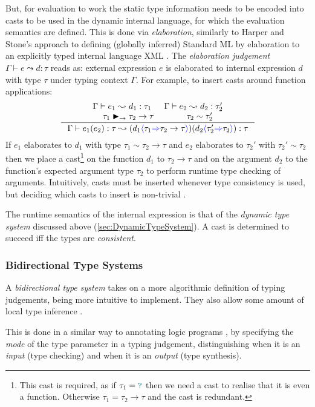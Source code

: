 But, for evaluation to work the static type information needs to be encoded into casts to be used in the dynamic internal language, for which the evaluation semantics are defined. This is done via \textit{elaboration}, similarly to Harper and Stone's approach to defining (globally inferred) Standard ML \cite{StandardMLTypeTheory} by elaboration to an explicitly typed internal language XML \cite{CoreXML}. The \textit{elaboration judgement} $\Gamma \vdash e \leadsto d : \tau$ reads as: external expression $e$ is elaborated to internal expression $d$ with type $\tau$ under typing context $\Gamma$. For example, to insert casts around function applications:
\[\inference{\Gamma \vdash e_1 \leadsto d_1 : \tau_1 & \Gamma \vdash e_2 \leadsto d_2 : \tau_2' \\ \tau_1 \funmatch \tau_2 \to \tau  & \tau_2 \sim \tau_2'}{\Gamma \vdash e_1(e_2) : \tau \leadsto (d_1\scast{\tau_1}{\tau_2 \to \tau})(d_2\scast{\tau_2'}{\tau_2}) : \tau}\]
If $e_1$ elaborates to $d_1$ with type $\tau_1 \sim \tau_2 \to \tau$ and $e_2$ elaborates to $\tau_2'$ with $\tau_2' \sim \tau_2$ then we place a cast\footnote{This cast is required, as if $\tau_1 = {\color{teal}\texttt{?}}$ then we need a cast to realise that it is even a function. Otherwise $\tau_1 = \tau_2 \to \tau$ and the cast is redundant.} on the function $d_1$ to $\tau_2 \to \tau$ and on the argument $d_2$ to the function's expected argument type $\tau_2$ to perform runtime type checking of arguments.
Intuitively, casts must be inserted whenever type consistency is used, but deciding which casts to insert is non-trivial \cite{Gradualizer}.

The runtime semantics of the internal expression is that of the \textit{dynamic type system} discussed above (\ref{sec:DynamicTypeSystem}). A cast is determined to succeed iff the types are \textit{consistent}.

\subsubsection{Bidirectional Type Systems}\label{sec:BidirectionalTypeSystem}
A \textit{bidirectional type system} \cite{BidirectionalTypes} takes on a more algorithmic definition of typing judgements, being more intuitive to implement. They also allow some amount of local type inference \cite{LocalInference}.

This is done in a similar way to annotating logic programs \cite[123]{LogicProg}, by specifying the \textit{mode} of the type parameter in a typing judgement, distinguishing when it is an \textit{input} (type checking) and when it is an \textit{output} (type synthesis).


